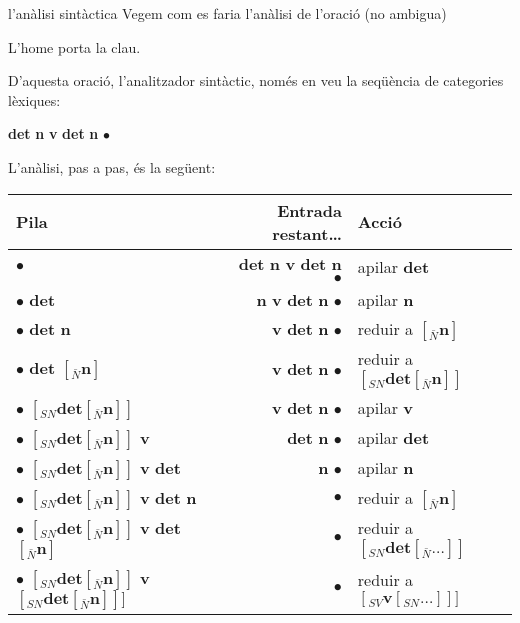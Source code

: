 \begin{persabermes}{l'anàlisi sintàctica}
Vegem com es faria l'anàlisi de l'oració (no ambigua)
\begin{example}
L'home porta la clau.
\end{example}
D'aquesta oració, l'analitzador sintàctic, només en veu la seqüència
de categories lèxiques:
\begin{example}
\textbf{det} \textbf{n} \textbf{v} \textbf{det} \textbf{n} \mbox{$\bullet$}
\end{example}
L'anàlisi, pas a pas, és la següent:
\begin{center}
  \begin{tabular}{l|r|l}
  \hline
  Pila & Entrada restant\ldots & Acció  \\
  \hline
  $\bullet$             
  & 
  \textbf{det} \textbf{n} \textbf{v} \textbf{det} \textbf{n} $\bullet$
  & 
  apilar \textbf{det} 
  \\
  $\bullet$ \textbf{det}
  & 
  \textbf{n} \textbf{v} \textbf{det} \textbf{n} $\bullet$
  & 
  apilar \textbf{n} 
  \\
  $\bullet$ \textbf{det} \textbf{n}
  & 
  \textbf{v} \textbf{det} \textbf{n} $\bullet$
  & 
  reduir a $[_{\bar{N}} \mathbf{n} ]$
  \\
  $\bullet$ \textbf{det} $[_{\bar{N}} \textbf{n} ]$
  & 
  \textbf{v} \textbf{det} \textbf{n} $\bullet$
  & 
  reduir a $[_{SN} \textbf{det} [_{\bar{N}} \mathbf{n} ] ]$
  \\
  $\bullet$ $[_{SN} \textbf{det} [_{\bar{N}} \textbf{n} ] ]$
  & 
  \textbf{v} \textbf{det} \textbf{n} $\bullet$
  & 
  apilar \textbf{v}
  \\
  $\bullet$ $[_{SN} \textbf{det} [_{\bar{N}} \textbf{n} ] ]$ \textbf{v}
  & 
  \textbf{det} \textbf{n} $\bullet$
  & 
  apilar \textbf{det}
  \\
  $\bullet$ $[_{SN} \textbf{det} [_{\bar{N}} \textbf{n} ] ]$
  \textbf{v} \textbf{det}
  & 
  \textbf{n} $\bullet$
  & 
  apilar \textbf{n}
  \\
  $\bullet$ $[_{SN} \textbf{det} [_{\bar{N}} \textbf{n} ] ]$
  \textbf{v} \textbf{det} \textbf{n}
  & 
  $\bullet$
  & 
  reduir a $[_{\bar{N}} \mathbf{n} ]$
  \\
  $\bullet$ $[_{SN} \textbf{det} [_{\bar{N}} \textbf{n} ] ]$
  \textbf{v} \textbf{det} $[_{\bar{N}} \textbf{n} ]$
  & 
  $\bullet$
  & 
  reduir a $[_{SN} \textbf{det} [_{\bar{N}} \ldots ] ]$
  \\
  $\bullet$ $[_{SN} \textbf{det} [_{\bar{N}} \textbf{n} ] ]$
  \textbf{v} $[_{SN} \textbf{det} [_{\bar{N}} \textbf{n} ] ] ]$
  & 
  $\bullet$
  & 
  reduir a $[_{SV} \textbf{v} [_{SN} \ldots ] ] ]$

\end{tabular}
\end{center}
\end{persabermes}
